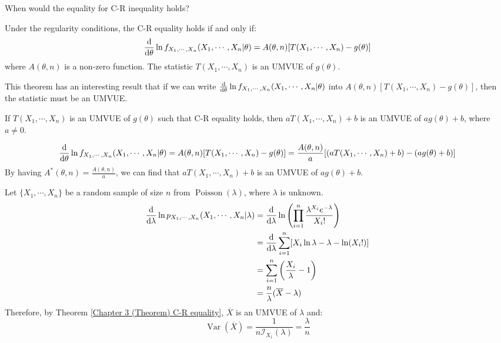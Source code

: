 \documentclass{huhtakm-template-book-v2}
\DeclareMathOperator{\Var}{Var}
\DeclareMathOperator{\Poisson}{Poisson}
\begin{document}
\newpage
When would the equality for C-R inequality holds?
\begin{thm}
	\label{Chapter 3 (Theorem) C-R equality}
	Under the regularity conditions, the C-R equality holds if and only if:
	\begin{equation*}
		\odv*{\ln{f_{X_{1},\cdots,X_{n}}(X_{1},\cdots,X_{n}|\theta)}}{\theta}=A(\theta,n)[T(X_{1},\cdots,X_{n})-g(\theta)]
	\end{equation*}
	where $A(\theta,n)$ is a non-zero function. The statistic $T(X_{1},\cdots,X_{n})$ is an UMVUE of $g(\theta)$. 
\end{thm}
This theorem has an interesting result that if we can write $\odv*{\ln{f_{X_{1},\cdots,X_{n}}(X_{1},\cdots,X_{n}|\theta)}}{\theta}$ into $A(\theta,n)[T(X_{1},\cdots,X_{n})-g(\theta)]$, then the statistic must be an UMVUE.
\begin{lem}
	If $T(X_{1},\cdots,X_{n})$ is an UMVUE of $g(\theta)$ such that C-R equality holds, then $aT(X_{1},\cdots,X_{n})+b$ is an UMVUE of $ag(\theta)+b$, where $a\neq 0$.
\end{lem}
\begin{proofing}
	\begin{equation*}
		\odv*{\ln{f_{X_{1},\cdots,X_{n}}(X_{1},\cdots,X_{n}|\theta)}}{\theta}=A(\theta,n)[T(X_{1},\cdots,X_{n})-g(\theta)]=\frac{A(\theta,n)}{a}[(aT(X_{1},\cdots,X_{n})+b)-(ag(\theta)+b)]
	\end{equation*}
	By having $A^{*}(\theta,n)=\frac{A(\theta,n)}{a}$, we can find that $aT(X_{1},\cdots,X_{n})+b$ is an UMVUE of $ag(\theta)+b$.
\end{proofing}
\begin{eg}
	Let $\{X_{1},\cdots,X_{n}\}$ be a random sample of size $n$ from $\Poisson(\lambda)$, where $\lambda$ is unknown.
	\begin{align*}
		\odv*{\ln{p_{X_{1},\cdots,X_{n}}(X_{1},\cdots,X_{n}|\lambda)}}{\lambda}&=\odv*{\ln\left(\prod_{i=1}^{n}\frac{\lambda^{X_{i}}e^{-\lambda}}{X_{i}!}\right)}{\lambda}\\
		&=\odv*{\sum_{i=1}^{n}[X_{i}\ln{\lambda}-\lambda-\ln(X_{i}!)]}{\lambda}\\
		&=\sum_{i=1}^{n}\left(\frac{X_{i}}{\lambda}-1\right)\\
		&=\frac{n}{\lambda}(\overline{X}-\lambda)
	\end{align*}
	Therefore, by Theorem \ref{Chapter 3 (Theorem) C-R equality}, $\overline{X}$ is an UMVUE of $\lambda$ and:
	\begin{equation*}
		\Var(\overline{X})=\frac{1}{n\mathcal{I}_{X_{1}}(\lambda)}=\frac{\lambda}{n}
	\end{equation*}
\end{eg}
\end{document}
